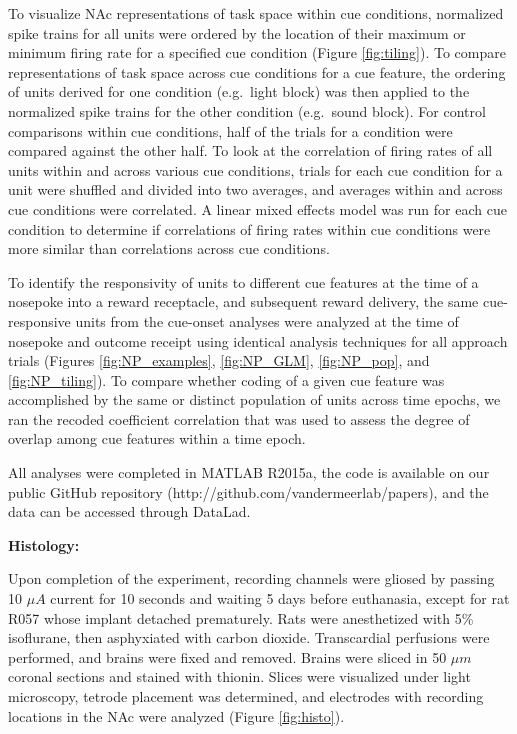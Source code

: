 \documentclass[11pt]{article}
\begin{document}
To visualize NAc representations of task space within cue conditions,
normalized spike trains for all units were ordered by the location of
their maximum or minimum firing rate for a specified cue condition
(Figure \ref{fig:tiling}). To compare representations of task space
across cue conditions for a cue feature, the ordering of units derived
for one condition (e.g.\ light block) was then applied to the
normalized spike trains for the other condition (e.g.\ sound
block). For control comparisons within cue conditions, half of the
trials for a condition were compared against the other half. To look
at the correlation of firing rates of all units within and across
various cue conditions, trials for each cue condition for a unit were
shuffled and divided into two averages, and averages within and across
cue conditions were correlated. A linear mixed effects model was run
for each cue condition to determine if correlations of firing rates
within cue conditions were more similar than correlations across cue
conditions.

To identify the responsivity of units to different cue features at the time of a nosepoke into a reward receptacle, and subsequent reward delivery, the same cue-responsive units from the cue-onset analyses were analyzed at the time of nosepoke and outcome receipt using identical analysis techniques for all approach trials (Figures \ref{fig:NP_examples}, \ref{fig:NP_GLM}, \ref{fig:NP_pop}, and \ref{fig:NP_tiling}). To compare whether coding of a given cue feature was accomplished by the same or distinct population of units across time epochs, we ran the recoded coefficient correlation that was used to assess the degree of overlap among cue features within a time epoch.

All analyses were completed in MATLAB R2015a, the code
is available on our public GitHub repository
(http://github.com/vandermeerlab/papers), and the data can be accessed
through DataLad.

{\bf Histology:}

Upon completion of the experiment, recording channels were gliosed by passing 10 $\mu A$ current for 10 seconds and waiting 5 days before euthanasia, except for rat R057 whose implant detached prematurely. Rats were anesthetized with 5\%
isoflurane, then asphyxiated with carbon dioxide. Transcardial
perfusions were performed, and brains were fixed and removed. Brains
were sliced in 50 $\mu m$ coronal sections and stained with
thionin. Slices were visualized under light microscopy, tetrode
placement was determined, and electrodes with recording locations in
the NAc were analyzed (Figure \ref{fig:histo}).
\end{document}
